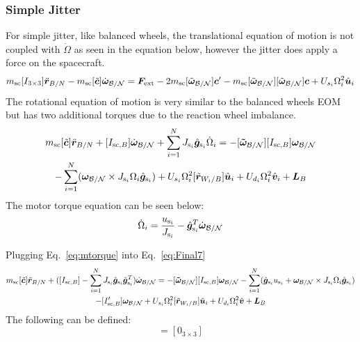 \subsubsection{Simple Jitter}

For simple jitter, like balanced wheels, the translational equation of motion is not coupled with $\dot{\Omega}$ as seen in the equation below, however the jitter does apply a force on the spacecraft.
\begin{equation}
m_{\text{sc}} [I_{3 \times 3}]\ddot{\bm r}_{B/N}
-m_{\text{sc}} [\tilde{\bm{c}}] \dot{\bm\omega}_{\cal B/N} 
= \bm F_{\text{ext}}- 2 m_{\text{sc}} [\tilde{\bm\omega}_{\cal B/N}] \bm c'
-m_{\text{sc}} [\tilde{\bm\omega}_{\cal B/N}][\tilde{\bm\omega}_{\cal B/N}]\bm{c} + U_{s_i}\Omega_i^2\hat{\bm{u}}_i
\label{eq:Rbddot35}
\end{equation}
The rotational equation of motion is very similar to the balanced wheels EOM but has two additional torques due to the reaction wheel imbalance. 
\begin{multline}
m_{\text{sc}}[\tilde{\bm{c}}] \ddot{\bm r}_{B/N}
+[I_{\text{sc},B}] \dot{\bm\omega}_{\cal B/N}
+\sum_{i=1}^{N}J_{\text{s}_i} \hat{\bm g}_{\text{s}_i}\dot{\Omega}_i
= -[\bm{\tilde{\omega}}_{\cal B/N}] [I_{\text{sc},B}] \bm\omega_{\cal B/N} \\
- \sum_{i=1}^{N}(\bm\omega_{\cal B/N}\times J_{\text{s}_i}\Omega_i\hat{\bm g}_{\text{s}_i})
+ U_{s_i}\Omega_i^2[\tilde{\bm{r}}_{W_i/B}]\hat{\bm{u}}_i + U_{d_i}\Omega_i^2\hat{\bm{v}}_i + \bm{L}_B
\label{eq:Final7}
\end{multline}
The motor torque equation can be seen below:
\begin{equation}
\dot{\Omega}_i = \frac{u_{\text{s}_i}}{J_{\text{s}_i}}-\hat{\bm g}_{\text{s}_i}^T \dot{\bm{\omega}}_{\cal B/N}
\label{eq:mtorque}
\end{equation}

Plugging Eq.~\eqref{eq:mtorque} into Eq.~\eqref{eq:Final7}
\begin{multline}
m_{\text{sc}}[\tilde{\bm{c}}] \ddot{\bm r}_{B/N}
+([I_{\text{sc},B}]-\sum_{i=1}^{N}J_{\text{s}_i} \hat{\bm g}_{\text{s}_i} \hat{\bm g}_{\text{s}_i}^T) \dot{\bm\omega}_{\cal B/N}
= -[\bm{\tilde{\omega}}_{\cal B/N}] [I_{\text{sc},B}] \bm\omega_{\cal B/N} - \sum_{i=1}^{N}(\hat{\bm g}_{\text{s}_i} u_{\text{s}_i} + \bm\omega_{\cal B/N}\times J_{\text{s}_i}\Omega_i\hat{\bm g}_{\text{s}_i})
\\- [I'_{\text{sc},B}] \bm\omega_{\cal B/N} + U_{s_i}\Omega_i^2[\tilde{\bm{r}}_{W_i/B}]\hat{\bm{u}}_i + U_{d_i}\Omega_i^2\hat{\bm{v}} + \bm{L}_B
\label{eq:Final72}
\end{multline}
The following can be defined:
\begin{equation}
[A_\text{contr}] = [0_{3 \times 3}]
\end{equation}

